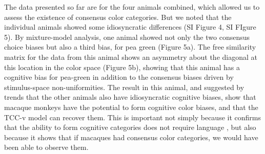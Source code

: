 The data presented so far are for the four animals combined, which allowed us to assess the existence of consensus color categories. But we noted that the individual animals showed some idiosyncratic differences (SI Figure 4, SI FIgure 5).
By mixture-model analysis, one animal showed not only the two consensus choice biases but also a third bias, for pea green (Figure 5a). The free similarity matrix for the data from this animal shows an asymmetry about the diagonal at this location in the color space (Figure 5b), showing that this animal has a cognitive bias for pea-green in addition to the consensus biases driven by stimulus-space non-uniformities. The result in this animal, and suggested by trends that the other animals also have idiosyncratic cognitive biases, show that macaque monkeys have the potential to form cognitive color biases, and that the TCC-v model can recover them. This is important not simply because it confirms that the ability to form cognitive categories does not require language \citep{panichello_error-correcting_2019}, but also because it shows that if macaques had consensus color categories, we would have been able to observe them.


